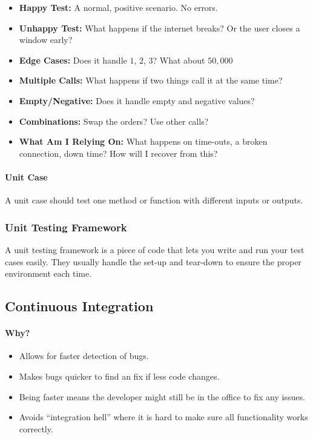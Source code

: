 \begin{itemize}
	\item \textbf{Happy Test:} A normal, positive scenario. No errors.
	\item \textbf{Unhappy Test:} What happens if the internet breaks? Or the user closes a window early?
	\item \textbf{Edge Cases:} Does it handle \(1\), \(2\), \(3\)? What about \(50,000\)
	\item \textbf{Multiple Calls:} What happens if two things call it at the same time?
	\item \textbf{Empty/Negative:} Does it handle empty and negative values?
	\item \textbf{Combinations:} Swap the orders? Use other calls?
	\item \textbf{What Am I Relying On:} What happens on time-outs, a broken connection, down time? How will I recover from this?
\end{itemize}

\paragraph{Unit Case}\label{par:unit_case}

A unit case should test one method or function with different inputs or outputs.

\subsubsection{Unit Testing Framework}\label{ssub:unit_testing_framework}

A unit testing framework is a piece of code that lets you write and run your test cases easily.
They usually handle the set-up and tear-down to ensure the proper environment each time.

\subsection{Continuous Integration}\label{sub:continuous_integration}

\paragraph{Why?}\label{par:why_}

\begin{itemize}
	\item Allows for faster detection of bugs.
	\item Makes bugs quicker to find an fix if less code changes.
	\item Being faster means the developer might still be in the office to fix any issues.
	\item Avoids ``integration hell'' where it is hard to make sure all functionality works correctly.
\end{itemize}

